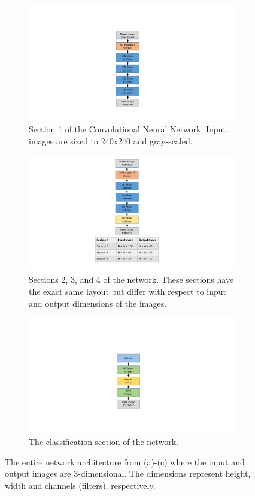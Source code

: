 \documentclass{osa-article}
\begin{document}
\begin{figure}
  \begin{subfigure}{0.45\textwidth}
    \centering\includegraphics[width=.55\linewidth]{section1}
    \caption{Section 1 of the Convolutional Neural Network. Input images are sized to 240x240 and gray-scaled.}\label{section1}
  \end{subfigure}\hfill
  \begin{subfigure}{0.45\textwidth}
    \centering
    \includegraphics[width=1.2\linewidth]{section_x}
    \caption{Sections 2, 3, and 4 of the network. These sections have the exact same layout but differ with respect to input and output dimensions of the images.}\label{sec_x}
  \end{subfigure}
  \centering
  \begin{subfigure}{0.45\textwidth}
    \centering
    \includegraphics[width=.55\linewidth]{classifying_sec}
    \caption{The classification section of the network.}\label{classifying}
  \end{subfigure}
  \caption{The entire network architecture from (a)-(c) where the input and output images are 3-dimensional. The dimensions represent height, width and channels (filters), respectively.}
\end{figure}
%
\end{document}
